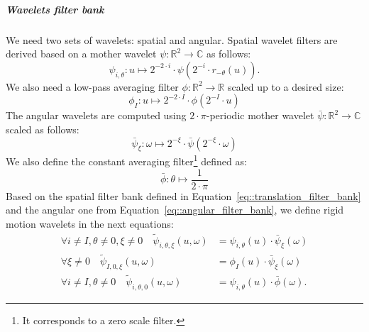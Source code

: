                 \subparagraph{Wavelets filter bank}
                    We need two sets of wavelets: spatial and angular.
                    Spatial wavelet filters are derived based on a mother wavelet $\psi: \mathbb{R}^2 \rightarrow \mathbb{C}$ as follows:
                    \begin{equation}
                        \label{eq::translation_filter_bank}
                        \psi_{i,\theta} : u\mapsto 2^{-2\cdot i}\cdot\psi\left(2^{-i}\cdot r_{-\theta}(u)\right).
                    \end{equation}
                    We also need a low-pass averaging filter $\phi: \mathbb{R}^2 \rightarrow \mathbb{R}$ scaled up to a desired size:
                    \begin{equation}
                        \label{eq::translation_low_pass}
                        \phi_I: u\mapsto 2^{-2\cdot I}\cdot\phi\left(2^{-I}\cdot u\right)
                    \end{equation}
                    The angular wavelets are computed using $2\cdot\pi$-periodic mother wavelet $\bar\psi: \mathbb{R}^2 \rightarrow \mathbb{C}$ scaled as follows:
                    \begin{equation}
                        \label{eq::angular_filter_bank}
                        \bar\psi_{\xi}: \omega \mapsto 2^{-\xi}\cdot\bar\psi\left(2^{-\xi}\cdot \omega\right)
                    \end{equation}
                    We also define the constant averaging filter\footnote{It corresponds to a zero scale filter.} defined as:
                    \begin{equation}
                        \label{eq::angular_low_pass}
                        \bar\phi: \theta \mapsto \frac{1}{2\cdot\pi}
                    \end{equation}
                    Based on the spatial filter bank defined in Equation~\ref{eq::translation_filter_bank} and the angular one from Equation~\ref{eq::angular_filter_bank}, we define rigid motion wavelets in the next equations:
                    \begin{align}
                        \label{eq::roto-translation_filter_bank}
                        \forall i\neq I, \theta \neq 0, \xi \neq 0 \quad \tilde{\psi}_{i, \theta, \xi}(u, \omega) &= \psi_{i,\theta}(u) \cdot \bar\psi_{\xi}(\omega)\\
                        \forall \xi \neq 0 \quad \tilde{\psi}_{I, 0, \xi}(u, \omega) &= \phi_I(u) \cdot \bar\psi_{\xi}(\omega)\\
                        \forall i\neq I, \theta \neq 0 \quad \tilde{\psi}_{i, \theta, 0}(u, \omega) &= \psi_{i,\theta}(u) \cdot \bar\phi(\omega).
                    \end{align}
